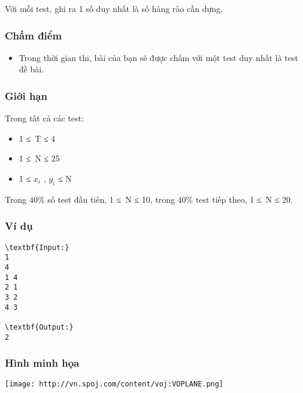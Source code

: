 Với mỗi test, ghi ra 1 số duy nhất là số hàng rào cần dựng.

\subsubsection{Chấm điểm}
\begin{itemize}
	\item Trong thời gian thi, bài của bạn sẽ được chấm với một test duy nhất là test đề bài.
\end{itemize}

\subsubsection{Giới hạn}

Trong tất cả các test:
\begin{itemize}
	\item 1 ≤ T ≤ 4
	\item 1 ≤ N ≤ 25
	\item 1 ≤ $x_{i}$ , $y_{i}$ ≤ N
\end{itemize}

Trong 40\% số test đầu tiên, 1 ≤ N ≤ 10, trong 40\% test tiếp theo, 1 ≤ N ≤ 20.

\subsubsection{Ví dụ}
\begin{verbatim}
\textbf{Input:}
1
4
1 4
2 1
3 2
4 3

\textbf{Output:}
2
\end{verbatim}

\subsubsection{Hình minh họa}


\texttt{[image: http://vn.spoj.com/content/voj:VOPLANE.png]}
